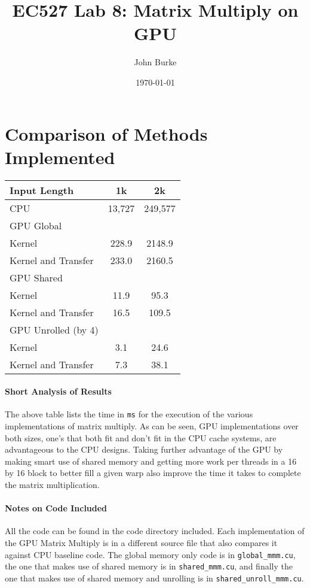 \documentclass[11pt]{article}
\author{John Burke}
\title{EC527 Lab 8: Matrix Multiply on GPU}
\date{\today}
\begin{document}
\maketitle

\section{Comparison of Methods Implemented}

\begin{tabular}[h!]{|l|cc|}
\hline
Input Length		&  1k    & 2k      \\ \hline
CPU 				& 13,727 & 249,577 \\ \hline
GPU Global			& 		 &         \\ 
Kernel				& 228.9	 & 2148.9  \\
Kernel and Transfer	& 233.0	 & 2160.5  \\ \hline
GPU Shared			& 		 &         \\ 
Kernel				& 11.9	 & 95.3    \\
Kernel and Transfer	& 16.5	 & 109.5  \\ \hline
GPU Unrolled (by 4)	& 		 &         \\ 
Kernel				& 3.1	 & 24.6    \\
Kernel and Transfer	& 7.3	 & 38.1  \\ \hline

\end{tabular}

\paragraph{Short Analysis of Results}
The above table lists the time in \texttt{ms} for the execution of the various implementations of matrix multiply.  As can be seen, GPU implementations over both sizes, one's that both fit and don't fit in the CPU cache systems, are advantageous to the CPU designs.  Taking further advantage of the GPU by making smart use of shared memory and getting more work per threads in a 16 by 16 block to better fill a given warp also improve the time it takes to complete the matrix multiplication.

\paragraph{Notes on Code Included}
All the code can be found in the code directory included.  Each implementation of the GPU Matrix Multiply is in a different source file that also compares it against CPU baseline code.  The global memory only code is in \texttt{global\_mmm.cu}, the one that makes use of shared memory is in \texttt{shared\_mmm.cu}, and finally the one that makes use of shared memory and unrolling is in \texttt{shared\_unroll\_mmm.cu}.
\end{document}
